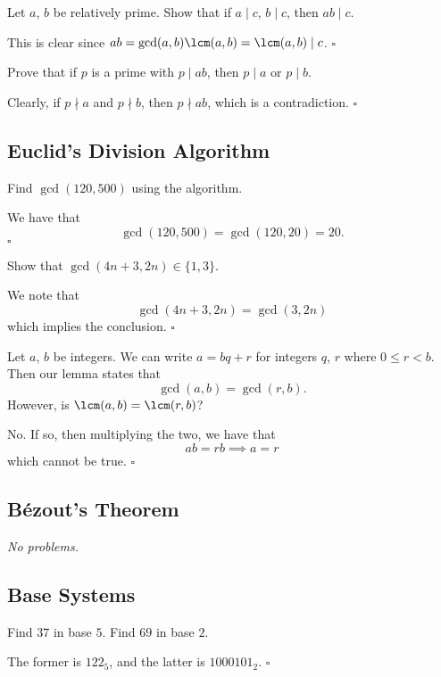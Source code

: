 \documentclass{article}
\begin{document}
\begin{problem}[1.6.3]{}
Let $a$, $b$ be relatively prime. Show that if $a \mid c$, $b \mid c$, then $ab \mid c$.
\end{problem}
This is clear since $ab = \gcd(a,b)\lcm(a,b) = \lcm(a,b) \mid c$. $\square$

\begin{problem}[1.6.4]{}
Prove that if $p$ is a prime with $p \mid ab$, then $p \mid a$ or $p \mid b$.
\end{problem}
Clearly, if $p \nmid a$ and $p \nmid b$, then $p \nmid ab$, which is a contradiction. $\square$

\subsection{Euclid’s Division Algorithm}

\begin{problem}[1.7.1]{}
Find $\gcd(120, 500)$ using the algorithm.
\end{problem}
We have that \[\gcd(120, 500) = \gcd(120, 20) = \boxed{20}.\] $\square$

\begin{problem}[1.7.2]{}
Show that $\gcd(4n + 3, 2n) \in \{1, 3\}$.
\end{problem}
We note that \[\gcd(4n+3, 2n) = \gcd(3, 2n)\] which implies the conclusion. $\square$

\begin{problem}[1.7.3]{}
Let $a$, $b$ be integers. We can write $a = bq + r$ for integers $q$, $r$ where $0 \le r < b$. Then our lemma states that \[\gcd(a, b) = \gcd(r, b).\] However, is $\lcm(a, b) = \lcm(r, b)$?
\end{problem}
No. If so, then multiplying the two, we have that \[ab = rb \implies a = r\] which cannot be true. $\square$

\subsection{B\'ezout's Theorem}

\emph{No problems.}

\subsection{Base Systems}

\begin{problem}[1.9.1]{}
Find $37$ in base $5$. Find $69$ in base $2$.
\end{problem}
The former is $122_5$, and the latter is $1000101_2$. $\square$
\end{document}
